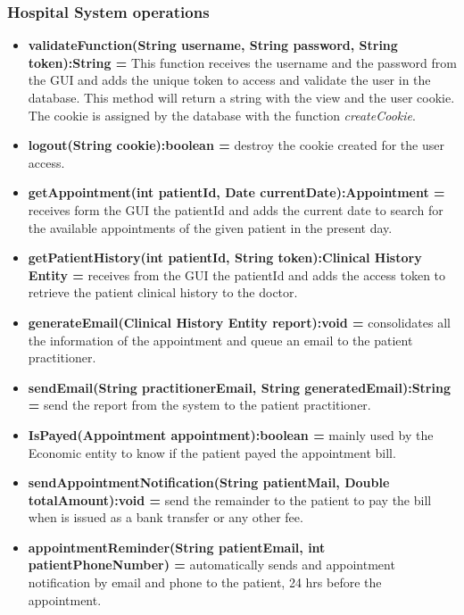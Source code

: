 \documentclass{article}
\begin{document}
            \subsubsection{Hospital System operations}
            \begin{itemize}
                \item \textbf{validateFunction(String username, String password, String token):String =} This function receives the username and the password from the GUI and adds the unique token to access and validate the user in the database. This method will return a string with the view and the
                user cookie. The cookie is assigned by the database with the function \textit{createCookie}.
                \item \textbf{logout(String cookie):boolean = } destroy the cookie created for the user access. 
                \item \textbf{getAppointment(int patientId, Date currentDate):Appointment = } receives form the GUI the patientId and adds the current date to search for the available appointments of the given patient in the present day. 
                \item \textbf{getPatientHistory(int patientId, String token):Clinical History Entity = } receives from the GUI the patientId and adds the access token to retrieve the patient clinical history to the doctor.
                \item \textbf{generateEmail(Clinical History Entity report):void = } consolidates all the information of the appointment and queue an email to the patient practitioner.
                \item \textbf{sendEmail(String practitionerEmail, String generatedEmail):String = } send the report from the system to the patient practitioner.
                \item \textbf{IsPayed(Appointment appointment):boolean = } mainly used by the Economic entity to know if the patient payed the appointment bill.
                \item \textbf{sendAppointmentNotification(String patientMail, Double totalAmount):void = } send the remainder to the patient to pay the bill when is issued as a bank transfer or any other fee.
                \item \textbf{appointmentReminder(String patientEmail, int patientPhoneNumber) = } automatically sends and appointment notification by email and phone to the patient, 24 hrs before the appointment. 
                
            \end{itemize}
\end{document}
